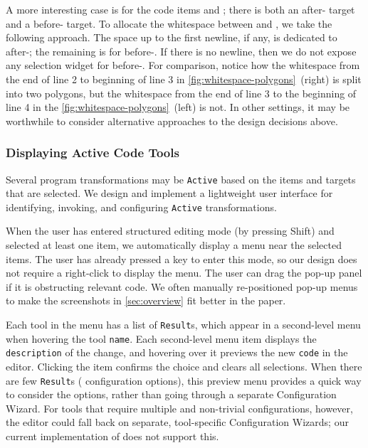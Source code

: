 A more interesting case is for the code items
\expTopDefNoBox
  {\targetsAround{{\varPat}}}
  {\targetsAround{{\varExp}}} and
\expLetNoBox
  {\targetsAround{{\varPat}}}
  {\targetsAround{{\varExp}}}
  {\cdots};
there is both an after-\varPat{} target and a before-\varExp{} target.
To allocate the whitespace between \varPat{} and \varExp{},
we take the following approach.
The space up to the first newline, if any, is dedicated to
after-\varPat{}; the remaining is for before-\varExp{}. If there is no
newline, then we do not expose any selection widget for before-\varExp{}.
For comparison, notice how the whitespace from the
end of line 2 to beginning of line 3 in
\autoref{fig:whitespace-polygons}~(right) is split into two polygons,
but the whitespace from the end of line 3 to the beginning of line 4 in
the \autoref{fig:whitespace-polygons}~(left) is not.
In other settings, it may be worthwhile to consider alternative approaches
to the design decisions above.


\subsubsection{Displaying Active Code Tools}

Several program transformations may be \verb+Active+ based on the items and
targets that are selected.
We design and implement a lightweight user interface for identifying, invoking,
and configuring \verb+Active+ transformations.



When the user has entered structured editing mode (by pressing Shift) and selected at least one
item, we automatically display a menu near the selected items. The user
has already pressed a key to enter this mode, so our design does not require a
right-click to display the menu.
The user can drag the pop-up panel if it is obstructing relevant code.
We often manually re-positioned pop-up menus to make the screenshots
in \autoref{sec:overview} fit better in the paper.


Each tool in the menu
has a list of \verb+Result+s, which appear
in a second-level menu when hovering the tool \verb+name+. Each second-level
menu item displays the \verb+description+ of the change, and hovering
over it previews the new \verb+code+ in the editor.
Clicking the item confirms the choice and clears all \deuce{} selections.
%
When there are few \verb+Result+s (\ie{} configuration options),
this preview menu provides a quick way to consider the options,
rather than going through a separate Configuration Wizard.
For tools that require multiple and non-trivial configurations,
however, the editor could fall back on separate, tool-specific
Configuration Wizards; our current implementation of \deuce{} does not support
this.
